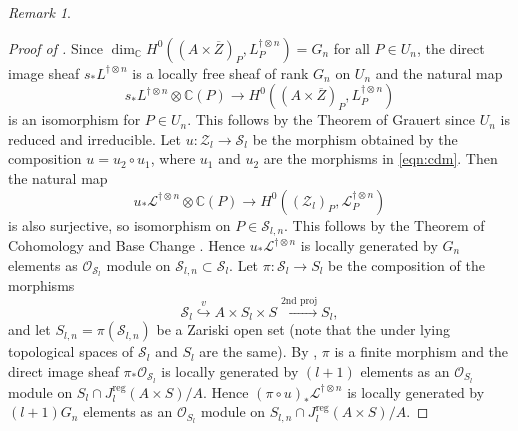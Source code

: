 \documentclass[11pt,english]{smfart}
\theoremstyle{plain}
\theoremstyle{definition}
\theoremstyle{remark}
\newtheorem{rem}[thm]{Remark}
\numberwithin{equation}{section}
\theoremstyle{plain}
\begin{document}
\begin{rem}
\begin{proof}[Proof of  ]
 
Since $\dim _{\mathbb C}H^0((A\times \overline{Z})_{P},L^{\dagger \otimes n}_{P})=G_n$ for all $P\in U_n$,
the direct image sheaf $s_{*}L^{\dagger \otimes n}$ is a locally free sheaf of rank $G_n$ on $U_n$ and the natural map
$$s_{*}L^{\dagger \otimes n}\otimes \mathbb C (P)\to H^0((A\times \overline{Z})_{P},L^{\dagger \otimes n}_{P})$$
is an isomorphism for $P\in U_n$. 
This follows by the Theorem of Grauert \cite[p.288]{hartshorne1977} since $U_n$ is reduced and irreducible. 
Let $u:\mathcal{Z}_l\to \mathcal{S}_l$ be the morphism obtained by the composition $u=u_2\circ u_1$, where $u_1$ and $u_2$ are the morphisms in \eqref{eqn:cdm}.
Then the natural map 
$$u_{*}\mathcal{L}^{\dagger \otimes n}\otimes \mathbb C (P)\to H^0((\mathcal{Z}_{l})_{P},\mathcal{L}^{\dagger \otimes n}_{P})$$
is also surjective, so isomorphism on $P\in \mathcal{S}_{l,n}$. 
This follows by the Theorem of Cohomology and Base Change \cite[p.290]{hartshorne1977}. 
Hence $u_{*}\mathcal{L}^{\dagger \otimes n}$ is locally generated by $G_n$ elements as $\mathcal{O}_{\mathcal{S}_{l}}$ module on $\mathcal{S}_{l,n}\subset \mathcal{S} _{l}$. 
Let $\pi :\mathcal{S}_l\to S_l$ be the composition of the morphisms
$$\mathcal{S}_l\overset{v}{\hookrightarrow} A\times S_l\times S \overset{\text{2nd proj}}{\longrightarrow} S_l,$$
and let $S_{l,n}=\pi (\mathcal{S}_{l,n})$ be a Zariski open set (note that the under lying topological spaces of $\mathcal{S}_{l}$ and $S_l$ are the same). 
By \cite[Corollary 3]{Yam15}, $\pi$ is a finite morphism and the direct image sheaf $\pi _*\mathcal O_{\mathcal{S}_{l}}$ is locally generated by $(l+1)$ elements as an $\mathcal{O}_{S_l}$ module on $S_l\cap J_{l}^{\text{reg}}(A\times S)/A$.
Hence $(\pi \circ u)_{*}\mathcal{L}^{\dagger \otimes n}$ is locally generated by $(l+1)G_n$ elements as an $\mathcal{O}_{S_l}$ module on $S_{l,n}\cap J_{l}^{\text{reg}}(A\times S)/A$.
\par



\end{proof}
\end{rem}
\end{document}
